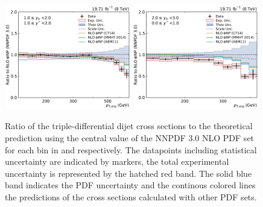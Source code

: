 \begin{figure}[htbp]
    \includegraphics[width=0.49\textwidth]{figures/measurement/ratio_to_NNPDF30+np_totcomp_yb1ys1.pdf}\hfill
    \includegraphics[width=0.49\textwidth]{figures/measurement/ratio_to_NNPDF30+np_totcomp_yb2ys0.pdf}
    \caption[Ratio of the cross section to NNPDF 3.0 NLO]{
    Ratio of the triple-differential dijet cross sections to the theoretical
    prediction using the central value of the NNPDF 3.0 NLO PDF set for each bin in \ystar
    and \yboost respectively. The datapoints including statistical uncertainty are
    indicated by markers, the total experimental uncertainty is represented by the
    hatched red band. The solid blue band indicates the PDF uncertainty and the
    continous colored lines the predictions of the cross sections calculated with
    other PDF sets.}
    \label{fig:ratio_nnpdf30_nlo}
\end{figure}


